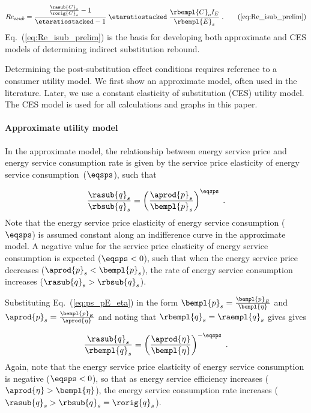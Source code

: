 \begin{equation}
  Re_{isub} = \frac{\frac{\rasub{C}_o}{\rorig{C}_o} - 1}{\etaratiostacked - 1} \; 
                          \etaratiostacked \; 
                          \frac{\rbempl{C}_o I_E}{\rbempl{E}_s} \; .
                              \tag{\ref{eq:Re_isub_prelim}}
\end{equation}
%
Eq.~(\ref{eq:Re_isub_prelim}) is the basis for
developing both approximate and CES models of determining
indirect substitution rebound.


Determining the post-substitution effect conditions
requires reference to a consumer utility model.
We first show an approximate model, often used in the literature. 
Later, we use a constant elasticity of substitution (CES)
utility model. 
The CES model is used for all calculations and graphs in this paper.


\paragraph{Approximate utility model} 
\label{sec:Resub_approximate_method}

In the approximate model, 
the relationship between energy service price and energy service consumption rate
is given by the service price elasticity of energy service consumption~($\eqsps$),
such that

\begin{equation}
  \frac{\rasub{q}_s}{\rbsub{q}_s} = \left( \frac{\aprod{p}_s}{\bempl{p}_s} \right)^{\eqsps} \; .
\end{equation}
%
Note that the energy service price elasticity of energy service consumption ($\eqsps$)
is assumed constant along an indifference curve
in the approximate model. 
A negative value for the service price elasticity of energy service consumption
is expected ($\eqsps < 0$),
such that when the energy service price decreases ($\aprod{p}_s < \bempl{p}_s$),
the rate of energy service consumption increases ($\rasub{q}_s > \rbsub{q}_s$).

Substituting Eq.~(\ref{eq:ps_pE_eta}) in the form
$\bempl{p}_s = \frac{\bempl{p}_E}{\bempl{\eta}}$ and
$\aprod{p}_s = \frac{\bempl{p}_E}{\aprod{\eta}}$
and noting that $\rbempl{q}_s = \raempl{q}_s$ gives
gives

\begin{equation} \label{eq:approx_qshat_over_qsorig}
  \frac{\rasub{q}_s}{\rbempl{q}_s} = \left( \frac{\aprod{\eta}}{\bempl{\eta}} \right)^{-\eqsps} \; .
\end{equation}
%
Again, note that the energy service price elasticity of energy service consumption
is negative ($\eqsps < 0$), so that
as energy service efficiency increases ($\aprod{\eta} > \bempl{\eta}$),
the energy service consumption rate increases ($\rasub{q}_s > \rbsub{q}_s = \rorig{q}_s$).

